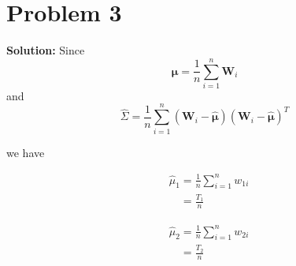 \documentclass[11pt]{article}
\begin{document}
\section*{Problem 3}
\textbf{Solution:} 
	Since \[\mathbf{\hat{\mu}} = \frac{1}{n} \sum_{i = 1}^n \mathbf{W}_i\] and 
	\[\hat{\Sigma} = \frac{1}{n} \sum_{i = 1}^n (\mathbf{W}_i - \mathbf{\hat{\mu}})(\mathbf{W}_i - \mathbf{\hat{\mu}})^T\]
	
	we have
	
	\begin{align}
		&\hat{\mu}_1 = \frac{1}{n} \sum_{i = 1}^n w_{1i}\nonumber\\
		&\phantom{\hat{\mu}_1} = \frac{T_1}{n}\nonumber
	\end{align}
	
	\begin{align}
		&\hat{\mu}_2 = \frac{1}{n} \sum_{i = 1}^n w_{2i}\nonumber\\
		&\phantom{\hat{\mu}_2} = \frac{T_2}{n}\nonumber
	\end{align}
	
\end{document}
